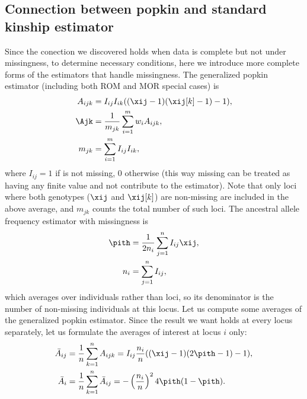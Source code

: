 \documentclass[11pt]{article}
\begin{document}
\begin{appendices}
  \section{Connection between popkin and standard kinship estimator}

  \label{sec:conn_popkin_std}  

  Since the conection we discovered holds when data is complete but not under missingness, to determine necessary conditions, here we introduce more complete forms of the estimators that handle missingness.
  The generalized popkin estimator (including both ROM and MOR special cases) is
  \begin{equation*}
    \begin{split}
      A_{ijk}
      &=
        I_{ij} I_{ik} ( (\xij-1)(\xij[k]-1) - 1 )
      , \\
      \Ajk
      &=
        \frac{1}{m_{jk}} \sum_{i=1}^m w_i A_{ijk}
        , \\
      m_{jk}
      &=
        \sum_{i=1}^m I_{ij} I_{ik}
        ,
    \end{split}
  \end{equation*}
  where $I_{ij} = 1$ if \xij is not missing, 0 otherwise (this way missing \xij can be treated as having any finite value and not contribute to the estimator).
  Note that only loci where both genotypes ($\xij$ and $\xij[k]$) are non-missing are included in the above average, and $m_{jk}$ counts the total number of such loci.
  The ancestral allele frequency estimator with missingness is
  \begin{align*}
    \pith
    &=
      \frac{1}{2 n_i} \sum_{j=1}^n I_{ij} \xij
      , \\
    n_i
    &=
      \sum_{j=1}^n I_{ij}
      ,
  \end{align*}
  which averages over individuals rather than loci, so its denominator is the number of non-missing individuals at this locus.
  Let us compute some averages of the generalized popkin estimator.
  Since the result we want holds at every locus separately, let us formulate the averages of interest at locus $i$ only:
  \begin{align*}
    \bar{A}_{ij}
    &=
      \frac{1}{n} \sum_{k=1}^n A_{ijk}
      =
      I_{ij} \frac{n_i}{n} ( ( \xij - 1 )( 2 \pith - 1 ) - 1 )
      , \\
    \bar{A}_i
    &=
      \frac{1}{n} \sum_{k=1}^n \bar{A}_{ij}
      =
      - \left( \frac{n_i}{n} \right)^2 4 \pith ( 1 - \pith )
      .
  \end{align*}

\end{appendices}
\end{document}

